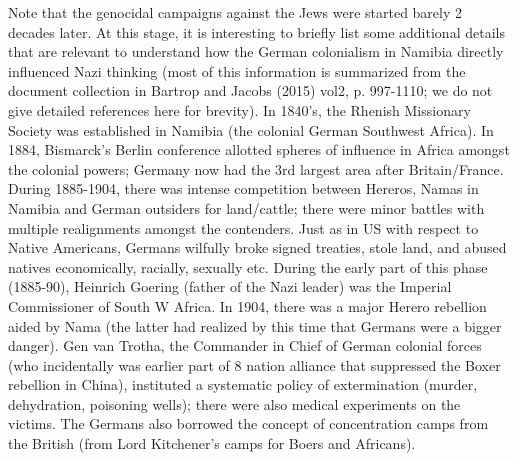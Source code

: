 Note that the genocidal campaigns against the Jews were started barely 2 decades later. At this stage, it is interesting to briefly list some additional details that are relevant to understand how the German colonialism in Namibia directly influenced Nazi thinking (most of this information is summarized from the document collection in Bartrop and Jacobs (2015) vol2, p. 997-1110; we do not give detailed references here for brevity). In 1840’s, the Rhenish Missionary Society was established in Namibia (the colonial German Southwest Africa). In 1884, Bismarck’s Berlin conference allotted spheres of influence in Africa amongst the colonial powers; Germany now had the 3rd largest area after Britain/France. During 1885-1904, there was intense competition between Hereros, Namas in Namibia and German outsiders for land/cattle; there were minor battles with multiple realignments amongst the contenders. Just as in US with respect to Native Americans, Germans wilfully broke signed treaties, stole land, and abused natives economically, racially, sexually etc. During the early part of this phase (1885-90), Heinrich Goering (father of the Nazi leader) was the Imperial Commissioner of South W Africa. In 1904, there was a major Herero rebellion aided by Nama (the latter had realized by this time that Germans were a bigger danger). Gen van Trotha, the Commander in Chief of German colonial forces (who incidentally was earlier part of 8 nation alliance that suppressed the Boxer rebellion in China), instituted a systematic policy of extermination (murder, dehydration, poisoning wells); there were also medical experiments on the victims. The Germans also borrowed the concept of concentration camps from the British (from Lord Kitchener's camps for Boers and Africans).
\vskip 2pt

